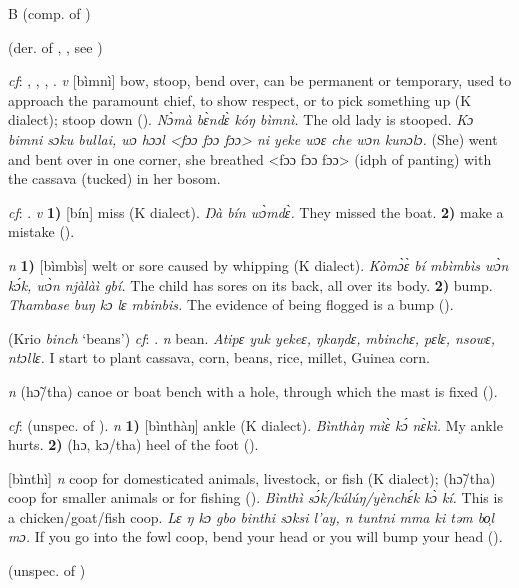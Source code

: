 \begin{letter}{B}
 (comp. of )

 (der. of , , see ) 

 \textit{cf}: , , , . \textit{v} [bìmnì] bow, stoop, bend over, can be permanent or temporary, used to approach the paramount chief, to show respect, or to pick something up (K dialect); stoop down (\citealt{Pichl1967}). \textit{Nɔ̀mà bɛ̀ndɛ̀ kóŋ bìmnì.} The old lady is stooped. \textit{Kɔ bimni sɔku bullai, wɔ hɔɔl <fɔɔ fɔɔ fɔɔ> ni yeke wɔɛ che wɔn kunɔlɔ.} (She) went and bent over in one corner, she breathed <fɔɔ fɔɔ fɔɔ> (idph of panting) with the cassava (tucked) in her bosom.

 \textit{cf}: . \textit{v} \textbf{1)} [bín] miss (K dialect). \textit{Ŋà bín wɔ̀mdɛ̀.} They missed the boat. \textbf{2)} make a mistake (\citealt{Pichl1967}).

 \textit{n} \textbf{1)} [bìmbìs] welt or sore caused by whipping (K dialect). \textit{Kòmɔ̀ɛ̀ bí mbìmbìs wɔ̀n kɔ́k, wɔ̀n njàlàì gbí.} The child has sores on its back, all over its body. \textbf{2)} bump. \textit{Thambase buŋ kɔ lɛ mbinbis.} The evidence of being flogged is a bump (\citealt{Pichl1967}). 

 (Krio \textit{binch} ‘beans') \textit{cf}: . \textit{n} bean. \textit{Atipɛ yuk yekeɛ, ŋkaŋdɛ, mbinchɛ, pɛlɛ, nsowɛ, ntɔllɛ.} I start to plant cassava, corn, beans, rice, millet, Guinea corn.

 \textit{n} (hɔ̃/tha) canoe or boat bench with a hole, through which the mast is fixed (\citealt{Pichl1967}).

 \textit{cf}:  (unspec. of ). \textit{n} \textbf{1)} [bìnthàŋ] ankle (K dialect). \textit{Bìnthàŋ mìɛ̀ kɔ́ nɛ̀kì.} My ankle hurts. \textbf{2)} (hɔ, kɔ/tha) heel of the foot (\citealt{Pichl1967}). 

 [bìnthì] \textit{n} coop for domesticated animals, livestock, or fish (K dialect); (hɔ̃/tha) coop for smaller animals or for fishing (\citealt{Pichl1967}). \textit{Bìnthì sɔ́k/kúlúŋ/yènchɛ́k kɔ̀ kí.} This is a chicken/goat/fish coop. \textit{Lɛ ŋ kɔ gbo binthi sɔksi l'ay, n tuntni mma ki təm bo̹l mɔ.} If you go into the fowl coop, bend your head or you will bump your head (\citealt{Pichl1967}). 

 (unspec. of )


\end{letter}
